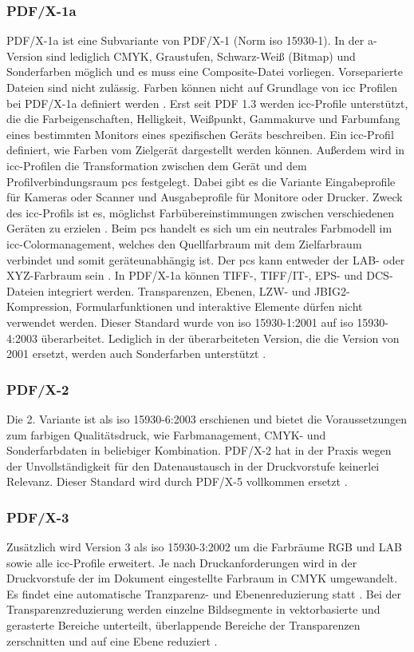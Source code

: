\subsubsection{PDF/X-1a}
PDF/X-1a ist eine Subvariante von PDF/X-1 (Norm \gls{iso} 15930-1). In der a-Version sind lediglich CMYK, Graustufen, Schwarz-Weiß (Bitmap) und Sonderfarben möglich und es muss eine Composite-Datei vorliegen. Vorseparierte Dateien sind nicht zulässig. Farben können nicht auf Grundlage von \gls{icc} Profilen bei PDF/X-1a definiert werden \cite{adobe-pdf-x, schneeberger}. Erst seit PDF 1.3 werden \gls{icc}-Profile unterstützt, die die Farbeigenschaften, Helligkeit, Weißpunkt, Gammakurve und Farbumfang eines bestimmten Monitors eines spezifischen Geräts beschreiben. Ein \gls{icc}-Profil definiert, wie Farben vom Zielgerät dargestellt werden können. Außerdem wird in \gls{icc}-Profilen die Transformation zwischen dem Gerät und dem Profilverbindungsraum \gls{pcs} festgelegt. Dabei gibt es die Variante Eingabeprofile für Kameras oder Scanner und Ausgabeprofile für Monitore oder Drucker. Zweck des \gls{icc}-Profils ist es, möglichst Farbübereinstimmungen zwischen verschiedenen Geräten zu erzielen \cite{benq}. Beim \gls{pcs} handelt es sich um ein neutrales Farbmodell im \gls{icc}-Colormanagement, welches den Quellfarbraum mit dem Zielfarbraum verbindet und somit geräteunabhängig ist. Der \gls{pcs} kann entweder der LAB- oder XYZ-Farbraum sein \cite{prepress}. In PDF/X-1a können  TIFF-, TIFF/IT-, EPS- und DCS-Dateien integriert werden. Transparenzen, Ebenen, LZW- und JBIG2-Kompression, Formularfunktionen und interaktive Elemente dürfen nicht verwendet werden. Dieser Standard wurde von \gls{iso} 15930-1:2001 auf \gls{iso} 15930-4:2003 überarbeitet. Lediglich in der überarbeiteten Version, die die Version von 2001 ersetzt, werden auch Sonderfarben unterstützt \cite{proj-consult, schneeberger}. 

\subsubsection{PDF/X-2}
Die 2. Variante ist als \gls{iso} 15930-6:2003 erschienen und bietet die Voraussetzungen zum farbigen Qualitätsdruck, wie Farbmanagement, CMYK- und Sonderfarbdaten in beliebiger Kombination. PDF/X-2 hat in der Praxis wegen der Unvollständigkeit für den Datenaustausch in der Druckvorstufe keinerlei Relevanz. Dieser Standard wird durch PDF/X-5 vollkommen ersetzt \cite{proj-consult, schneeberger}. 

\subsubsection{PDF/X-3}
Zusätzlich wird Version 3 als \gls{iso} 15930-3:2002 \cite{proj-consult} um die Farbräume RGB und LAB sowie alle \gls{icc}-Profile erweitert. Je nach Druckanforderungen wird in der Druckvorstufe der im Dokument eingestellte Farbraum in CMYK umgewandelt. Es findet eine automatische Tranzparenz- und Ebenenreduzierung statt \cite{adobe-pdf-x}. Bei der Transparenzreduzierung werden einzelne Bildsegmente in vektorbasierte und gerasterte Bereiche unterteilt, überlappende Bereiche der Transparenzen zerschnitten und auf eine Ebene reduziert \cite{adobe-transp, primus}.

